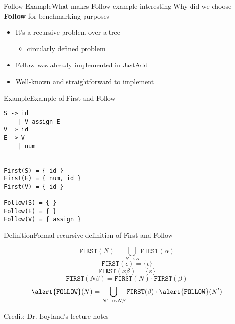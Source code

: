 \begin{frame}{Follow Example}{What makes Follow example interesting}
    Why did we choose \textbf{Follow} for benchmarking purposes
    \begin{itemize}
        \item It's a \alert{recursive} problem over a tree
        \begin{itemize}
            \item \alert{circularly defined problem}
        \end{itemize}
        \item Follow was \alert{already implemented} in JastAdd
        \item \alert{Well-known} and \alert{straightforward} to implement
    \end{itemize}
\end{frame}


\begin{frame}[fragile=singleslide]{Example}{Example of First and Follow}

\begin{multicols}{2}
\begin{Verbatim}[fontsize=\small]
S -> id
    | V assign E
V -> id
E -> V
    | num


First(S) = { id }
First(E) = { num, id }
First(V) = { id }

Follow(S) = { }
Follow(E) = { }
Follow(V) = { assign }
\end{Verbatim}
\end{multicols}

\end{frame}


\begin{frame}{Definition}{Formal recursive definition of First and Follow}

\[ \texttt{FIRST}(N) = \bigcup_{N \to \alpha} \texttt{FIRST}(\alpha) \]
\[ \texttt{FIRST}(\epsilon)   = \{ \epsilon \} \]
\[ \texttt{FIRST}(x \beta)   =\{x\} \]
\[ \texttt{FIRST}(N \beta)   =   \texttt{FIRST}(N) \cdot \texttt{FIRST}(\beta)  \]
\[ \alert{\texttt{FOLLOW}}(N) = \bigcup_{N' \to \alpha N \beta} \texttt{FIRST}(\beta) \cdot \alert{\texttt{FOLLOW}}(N') \]

\newlinevspace

Credit: Dr. Boyland's lecture notes
\end{frame}

